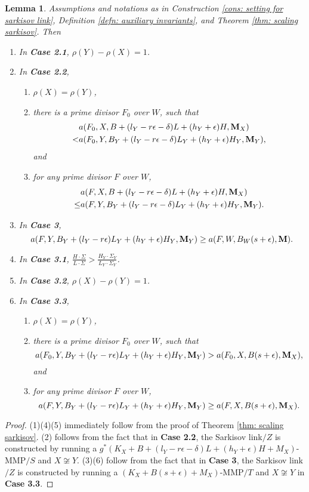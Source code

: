 \documentclass[11pt]{amsart}
\numberwithin{equation}{section}
\newcommand{\Mm}{{\bf{M}}}
\newtheorem{lem}[thm]{Lemma}
\theoremstyle{definition}
\theoremstyle{definition}
\theoremstyle{definition}
\begin{document}
\begin{lem}\label{lem: sar scaling terminalization}
Assumptions and notations as in Construction \ref{cons: setting for sarkisov link}, Definition \ref{defn: auxiliary invariants}, and Theorem \ref{thm: scaling sarkisov}. Then
\begin{enumerate}
    \item In \textbf{\rm\textbf{Case 2.1}}, $\rho(Y)-\rho(X)=1$.
    \item In \textbf{\rm\textbf{Case 2.2}},
    \begin{enumerate}
        \item $\rho(X)=\rho(Y)$,
        \item there is a prime divisor $F_0$ over $W$, such that 
    \begin{align*}
        &a(F_0,X,B+(l_Y-r\epsilon-\delta)L+(h_Y+\epsilon)H,\Mm_X)\\
        <&a(F_0,Y,B_Y+(l_Y-r\epsilon-\delta)L_Y+(h_Y+\epsilon)H_Y,\Mm_Y),
    \end{align*}
    and
    \item for any prime divisor $F$ over $W$,
      \begin{align*}
        &a(F,X,B+(l_Y-r\epsilon-\delta)L+(h_Y+\epsilon)H,\Mm_X)\\
        \leq &a(F,Y,B_Y+(l_Y-r\epsilon-\delta)L_Y+(h_Y+\epsilon)H_Y,\Mm_Y).
    \end{align*}
    \end{enumerate}
    \item In \textbf{\rm\textbf{Case 3}}, $$a(F,Y,B_Y+(l_Y-r\epsilon)L_Y+(h_Y+\epsilon)H_Y,\Mm_Y)\geq a(F,W,B_W(s+\epsilon),\Mm).$$
    \item In \textbf{\rm\textbf{Case 3.1}}, $\frac{H\cdot\Sigma}{L\cdot\Sigma}>\frac{H_Y\cdot\Sigma_Y}{L_Y\cdot\Sigma_Y}$.
    \item In \textbf{\rm\textbf{Case 3.2}}, $\rho(X)-\rho(Y)=1$.
    \item In \textbf{\rm\textbf{Case 3.3}},
    \begin{enumerate}
        \item $\rho(X)=\rho(Y)$,
        \item there is a prime divisor $F_0$ over $W$, such that 
   $$a(F_0,Y,B_Y+(l_Y-r\epsilon)L_Y+(h_Y+\epsilon)H_Y,\Mm_Y)> a(F_0,X,B(s+\epsilon),\Mm_X),$$
    and
    \item for any prime divisor $F$ over $W$,
   $$a(F,Y,B_Y+(l_Y-r\epsilon)L_Y+(h_Y+\epsilon)H_Y,\Mm_Y)\geq a(F,X,B(s+\epsilon),\Mm_X).$$
    \end{enumerate}
\end{enumerate}
\end{lem}
\begin{proof}
(1)(4)(5) immediately follow from the proof of Theorem \ref{thm: scaling sarkisov}. (2) follows from the fact that in \textbf{\rm\textbf{Case 2.2}}, the Sarkisov link$/Z$ is constructed by running a $g^*(K_X+B+(l_Y-r\epsilon-\delta)L+(h_Y+\epsilon)H+M_X)$-MMP$/S$ and $X\not\cong Y$. (3)(6) follow from the fact that in \textbf{\rm\textbf{Case 3}}, the Sarkisov link$/Z$ is constructed by running a $(K_X+B(s+\epsilon)+M_X)$-MMP$/T$ and $X\not\cong Y$ in \textbf{\rm\textbf{Case 3.3}}.
\end{proof}
\end{document}
